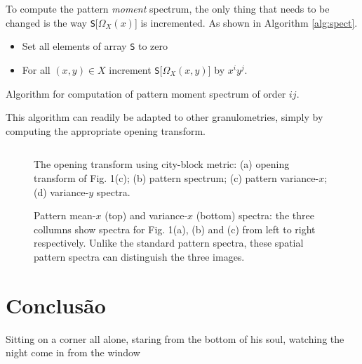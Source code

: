 \documentclass{sciposter}
\begin{document}
\begin{multicols}{3}
To compute the pattern \emph{moment} spectrum, the only thing that needs to be
changed is the way {\tt S}[$\Omega_X(x)$] is incremented. As shown in Algorithm
\ref{alg:spect}.

\begin{algorithm}
\begin{itemize}
\item Set all elements of array {\tt S} to zero
\item For all $(x,y) \in X$ increment {\tt S}[$\Omega_X(x,y)$] by 
$x^iy^j$. 
\end{itemize}
\caption{ Algorithm for computation of pattern moment
spectrum of order $ij$. \label{alg:spect}}
\end{algorithm}

This algorithm can 
readily be adapted to other granulometries, simply by computing the 
appropriate opening transform.

\begin{figure}
\begin{center}
\begin{tabular}{c c}

\end{tabular}
\end{center}
\caption{ \label{fig:tauspect} 
The opening transform using city-block metric: (a) opening transform of
Fig. 1(c); (b) pattern spectrum; (c) pattern variance-$x$; 
(d) variance-$y$ spectra.}
\end{figure}


\renewcommand{\imsize}{0.3\columnwidth}
\begin{figure}
\begin{center}
\end{center}
\caption{ \label{fig:binspect} Pattern mean-$x$ (top) and variance-$x$ 
(bottom) spectra: the three collumns show spectra for Fig. 1(a), (b) and (c) 
from left to right respectively.  Unlike the standard pattern spectra, 
these spatial pattern spectra can distinguish the three images.}
\end{figure}

\section{Conclusão}

Sitting on a corner all alone,
staring from the bottom of his soul,
watching the night come in from the window


\end{multicols}
\end{document}
